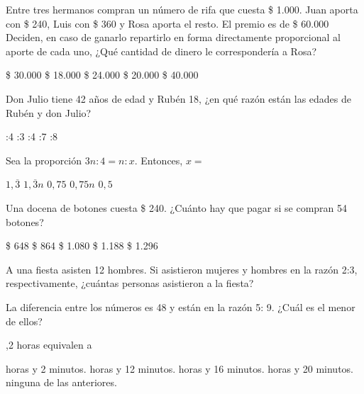 \documentclass[pagina vacia]{srs}
\begin{document}
\begin{preguntas}
\pregunta Entre tres hermanos compran un número de rifa que cuesta \$ 1.000.
Juan aporta con \$ 240, Luis con \$ 360 y Rosa aporta el resto. El premio es
de \$ 60.000 Deciden, en caso de ganarlo repartirlo en forma directamente
proporcional al aporte de cada uno, ¿Qué cantidad de dinero le correspondería a Rosa?
\begin{vertical}
\alternativa \$ 30.000
\alternativa \$ 18.000
\alternativa \$ 24.000
\alternativa \$ 20.000
\alternativa \$ 40.000
\end{vertical}

\pregunta Don Julio tiene 42 años de edad y Rubén 18, ¿en qué razón están las edades de Rubén y don Julio?
\begin{vertical}
:4
:3
:4
:7
:8
\end{vertical}

\pregunta Sea la proporción $3n:4=n:x$. Entonces, $x=$
\begin{vertical}
\alternativa $1,\overline{3}$
\alternativa $1,\overline{3} n$
\alternativa $0,75$
\alternativa $0,75 n$
\alternativa $0,5$
\end{vertical}

\pregunta Una docena de botones cuesta \$ 240. ¿Cuánto hay que pagar si se compran 54 botones?
\begin{vertical}
\alternativa \$ 648
\alternativa \$ 864
\alternativa \$ 1.080
\alternativa \$ 1.188
\alternativa \$ 1.296
\end{vertical}

\pregunta A una fiesta asisten 12 hombres. Si asistieron mujeres y hombres en la razón 2:3, respectivamente, ¿cuántas personas asistieron a la fiesta?
\begin{vertical}
\end{vertical}

\pregunta La diferencia entre los números es 48 y están en la razón 5: 9. ¿Cuál es el menor de ellos?
\begin{vertical}
\end{vertical}

,2 horas equivalen a
\begin{vertical}
 horas y 2 minutos.
 horas y 12 minutos.
 horas y 16 minutos.
 horas y 20 minutos.
\alternativa ninguna de las anteriores.
\end{vertical}


\end{preguntas}
\end{document}
